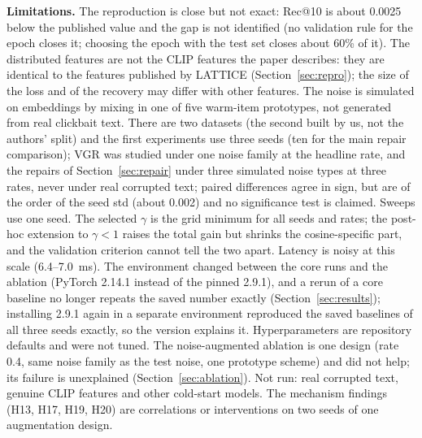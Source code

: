 \documentclass[conference]{IEEEtran}
\begin{document}
\textbf{Limitations.} The reproduction is close but not exact: Rec@10 is about 0.0025 below the published value and the gap is not identified (no validation rule for the epoch closes it; choosing the epoch with the test set closes about 60\% of it). The distributed features are not the CLIP features the paper describes: they are identical to the features published by LATTICE (Section~\ref{sec:repro}); the size of the loss and of the recovery may differ with other features. The noise is simulated on embeddings by mixing in one of five warm-item prototypes, not generated from real clickbait text. There are two datasets (the second built by us, not the authors' split) and the first experiments use three seeds (ten for the main repair comparison); VGR was studied under one noise family at the headline rate, and the repairs of Section~\ref{sec:repair} under three simulated noise types at three rates, never under real corrupted text; paired differences agree in sign, but are of the order of the seed std (about 0.002) and no significance test is claimed. Sweeps use one seed. The selected $\gamma$ is the grid minimum for all seeds and rates; the post-hoc extension to $\gamma<1$ raises the total gain but shrinks the cosine-specific part, and the validation criterion cannot tell the two apart. Latency is noisy at this scale (6.4--7.0~ms). The environment changed between the core runs and the ablation (PyTorch 2.14.1 instead of the pinned 2.9.1), and a rerun of a core baseline no longer repeats the saved number exactly (Section~\ref{sec:results}); installing 2.9.1 again in a separate environment reproduced the saved baselines of all three seeds exactly, so the version explains it. Hyperparameters are repository defaults and were not tuned. The noise-augmented ablation is one design (rate 0.4, same noise family as the test noise, one prototype scheme) and did not help; its failure is unexplained (Section~\ref{sec:ablation}). Not run: real corrupted text, genuine CLIP features and other cold-start models. The mechanism findings (H13, H17, H19, H20) are correlations or interventions on two seeds of one augmentation design.
\end{document}
